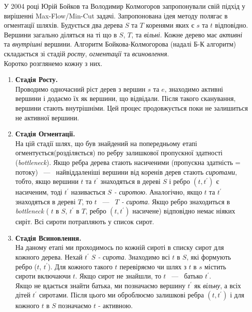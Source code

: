 У 2004 році Юрій Бойков та Володимир Колмогоров запропонували свій підхід \cite{boykov_kolmogorov}
у вирішенні Max-Flow/Min-Cut задачі.
Запропонована ідея методу полягає в огментації шляхів. Будується два дерева $S$ та $T$
коренями яких є $s$ та $t$ відповідно. Вершини загально діляться на ті що в $S$, $T$, та
\textit{вільні}. Кожне дерево має \textit{активні} та \textit{внутрішні} вершини.
Алгоритм Бойкова-Колмогорова (надалі Б-К алгоритм) складається зі стадій \textit{росту},
\textit{огментації} та \textit{всиновлення}.\\
Коротко розглянемо кожну з них.
\begin{enumerate}
    \item \textbf{Стадія Росту.} \\
          Проводимо одночасний ріст дерев з вершин $s$ та $e$, знаходимо активні
          вершини і додаємо їх як вершини, що відвідали. Після такого сканування, вершини
          стають внутрішніми. Цей процес продовжується поки не залишиться не активної вершини.
    \item \textbf{Стадія Огментації.} \\
          На цій стадії шлях, що був знайдений на попередньому етапі огментується(розділяється)
          по ребру залишкової пропускної здатності (\textit{bottleneck}). Якщо ребра дерева стають
          насиченими (пропускна здатність = потоку) ~---~ найвіддаленіші вершини від коренів дерев стають
          \textit{сиротами}, тобто, якщо вершини $t$ та $t^{'}$ знаходяться в дереві $S$
          і ребро $(t,t^{'})$ є насиченим, тоді $t^{'}$ називається \textit{$S$ - сиротою}.
          Аналогічно, якщо $t$ та $t^{'}$ знаходяться в дереві $T$, то  $t$ ~---~ \textit{$T$ - сирота}.
          Якщо ребро знаходиться в \textit{bottleneck} ( $t$ в $S$, $t^{'}$ в $T$, ребро $(t,t^{'})$
          насичене) відповідно немає ніяких сиріт. Всі сироти потрапляють у список сирот.
    \item \textbf{Стадія Всиновлення.} \\
          На даному етапі ми проходимось по кожній сироті в списку сирот для кожного дерева.
          Нехай $t^{'}$ \textit{$S$ - сирота}. Знаходимо всі $t$  в $S$, які формують ребро
          ($t$, $t^{'}$). Для кожного такого $t$ перевіряємо чи шлях з $t$ в $s$ містить сироти
          включаючи $t$. Якщо сирот не знайшли, то $t$ ~---~ батько  $t^{'}$. \\
          Якщо не вдається знайти батька, ми позначаємо вершину $t^{'}$ як \textit{вільну}, а всіх
          дітей $t^{'}$ сиротами. Після цього ми оброблюємо залишкові ребра $(t,t^{'})$ і для кожного $t$ в $S$ позначаємо
          $t$ - активною.
\end{enumerate}

